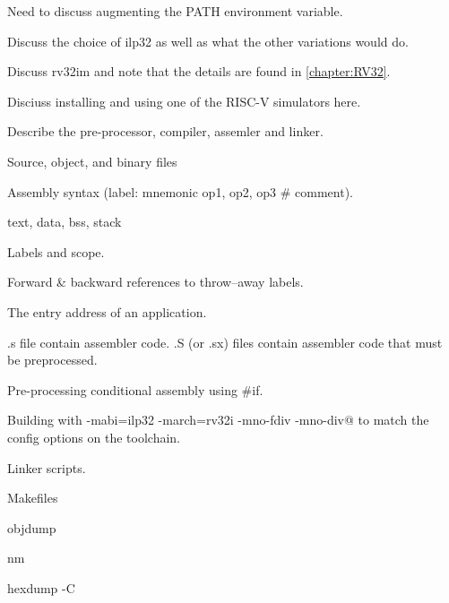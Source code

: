 Need to discuss augmenting the PATH environment variable.

Discuss the choice of ilp32 as well as what the other variations would do.

Discuss rv32im and note that the details are found in \autoref{chapter:RV32}.

Disciuss installing and using one of the RISC-V simulators 
here.

Describe the pre-processor, compiler, assemler and linker.

Source, object, and binary files

Assembly syntax (label: mnemonic op1, op2, op3  \# comment).

text, data, bss, stack

Labels and scope.

Forward \& backward references to throw--away labels.

The entry address of an application.

.s file contain assembler code.
.S (or .sx) files contain assembler code that must be preprocessed.~\cite[p.~29]{gcc:2017}

Pre-processing conditional assembly using \#if.

Building with \verb@-mabi=ilp32 -march=rv32i -mno-fdiv -mno-div@ to match
the config options on the toolchain.  

Linker scripts.

Makefiles

objdump

nm

hexdump -C
